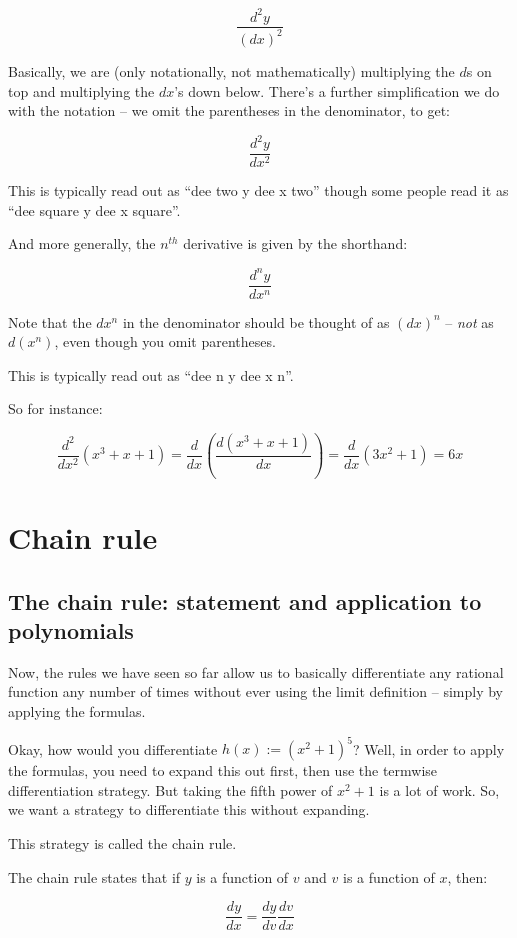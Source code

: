 \documentclass[10pt]{amsart}
\begin{document}
$$\frac{d^2y}{(dx)^2}$$

Basically, we are (only notationally, not mathematically) multiplying
the $d$s on top and multiplying the $dx$'s down below. There's a
further simplification we do with the notation -- we omit the
parentheses in the denominator, to get:

$$\frac{d^2y}{dx^2}$$

This is typically read out as ``dee two y dee x two'' though some
people read it as ``dee square y dee x square''.

And more generally, the $n^{th}$ derivative is given by the shorthand:

$$\frac{d^ny}{dx^n}$$

Note that the $dx^n$ in the denominator should be thought of as
$(dx)^n$ -- {\em not} as $d(x^n)$, even though you omit parentheses.

This is typically read out as ``dee n y dee x n''.

So for instance:

$$\frac{d^2}{dx^2} \left(x^3 + x + 1\right) = \frac{d}{dx} \left(\frac{d(x^3 + x + 1)}{dx}\right) = \frac{d}{dx} \left(3x^2 + 1\right) = 6x$$

\section{Chain rule}

\subsection{The chain rule: statement and application to polynomials}

Now, the rules we have seen so far allow us to basically differentiate
any rational function any number of times without ever using the limit
definition -- simply by applying the formulas.

Okay, how would you differentiate $h(x) := (x^2 + 1)^5$? Well, in
order to apply the formulas, you need to expand this out first, then
use the termwise differentiation strategy. But taking the fifth power
of $x^2 + 1$ is a lot of work. So, we want a strategy to differentiate
this without expanding.

This strategy is called the chain rule.

The chain rule states that if $y$ is a function of $v$ and $v$ is a
function of $x$, then:

$$\frac{dy}{dx} = \frac{dy}{dv} \frac{dv}{dx}$$
\end{document}
